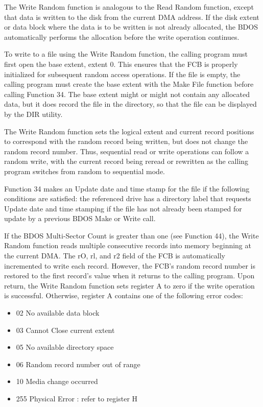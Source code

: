 The Write Random function is analogous to the Read Random function,
except that data is written to the disk from the current DMA
address. If the disk extent or data block where the data is to be
written is not already allocated, the BDOS automatically performs the
allocation before the write operation continues.

To write to a file using the Write Random function, the calling
program must first open the base extent, extent 0. This ensures that
the FCB is properly initialized for subsequent random access
operations. If the file is empty, the calling program must create the
base extent with the Make File function before calling Function
34. The base extent might or might not contain any allocated data, but
it does record the file in the directory, so that the file can be
displayed by the DIR utility.

The Write Random function sets the logical extent and current record
positions to correspond with the random record being written, but does
not change the random record number. Thus, sequential read or write
operations can follow a random write, with the current record being
reread or rewritten as the calling program switches from random to
sequential mode.

Function 34 makes an Update date and time stamp for the file if the
following conditions are satisfied: the referenced drive has a
directory label that requests Update date and time stamping if the
file has not already been stamped for update by a previous BDOS Make
or Write call.

If the BDOS Multi-Sector Count is greater than one (see Function 44),
the Write Random function reads multiple consecutive records into
memory beginning at the current DMA. The rO, rl, and r2 field of the
FCB is automatically incremented to write each record. However, the
FCB's random record number is restored to the first record's value
when it returns to the calling program. Upon return, the Write Random
function sets register A to zero if the write operation is
successful. Otherwise, register A contains one of the following error
codes:

\begin{itemize}
\item 02 No available data block
\item 03 Cannot Close current extent
\item 05 No available directory space
\item 06 Random record number out of range
\item 10 Media change occurred
\item 255 Physical Error : refer to register H
\end{itemize}

